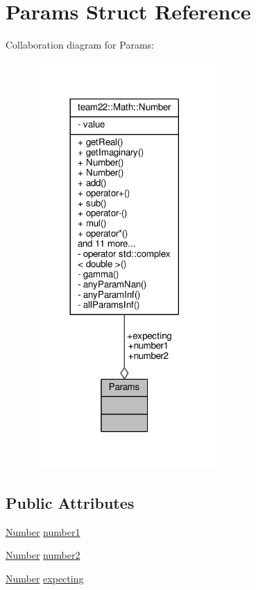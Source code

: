 \hypertarget{struct_params}{}\section{Params Struct Reference}
\label{struct_params}


Collaboration diagram for Params\+:
\nopagebreak
\begin{figure}[H]
\begin{center}
\leavevmode
\includegraphics[width=197pt]{struct_params__coll__graph}
\end{center}
\end{figure}
\subsection*{Public Attributes}
\begin{DoxyCompactItemize}
\item 
\hyperlink{classteam22_1_1_math_1_1_number}{Number} \hyperlink{struct_params_abfbdd38f4448b9722ca7faeffdf4ef36}{number1}
\item 
\hyperlink{classteam22_1_1_math_1_1_number}{Number} \hyperlink{struct_params_af25f02c145e03d78112c0a3e7258155f}{number2}
\item 
\hyperlink{classteam22_1_1_math_1_1_number}{Number} \hyperlink{struct_params_ac15c821d1c46c6d5571f3ee32ba0fdbb}{expecting}
\end{DoxyCompactItemize}

